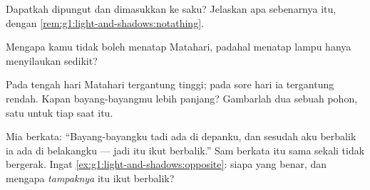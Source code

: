 \begin{exercise}[$\star$]\label{exo:g1:light-and-shadows:6}
Dapatkah  dipungut dan dimasukkan ke saku? Jelaskan apa
sebenarnya  itu, dengan \cref{rem:g1:light-and-shadows:notathing}.
\end{exercise}

\begin{exercise}[$\star$]\label{exo:g1:light-and-shadows:7}
Mengapa kamu tidak boleh menatap Matahari, padahal menatap lampu
hanya menyilaukan sedikit?
\end{exercise}

\begin{exercise}[$\star$]\label{exo:g1:light-and-shadows:8}
Pada tengah hari Matahari tergantung tinggi; pada sore hari ia
tergantung rendah. Kapan bayang-bayangmu lebih panjang? Gambarlah dua
 sebuah pohon, satu untuk tiap saat itu.
\end{exercise}

\begin{exercise}[$\star\star$]\label{exo:g1:light-and-shadows:9}
Mia berkata: ``Bayang-bayangku tadi ada di depanku, dan sesudah aku
berbalik ia ada di belakangku --- jadi  itu ikut
berbalik.'' Sam berkata  itu sama sekali tidak bergerak.
Ingat \cref{ex:g1:light-and-shadows:opposite}: siapa yang benar, dan
mengapa \emph{tampaknya}  itu ikut berbalik?
\end{exercise}
